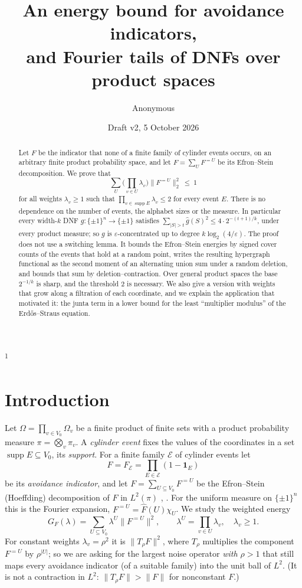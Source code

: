 \documentclass[11pt,reqno]{amsart}
\title[An energy bound for avoidance indicators]{An energy bound for avoidance indicators,\\
and Fourier tails of DNFs over product spaces}
\author{Anonymous}
\date{Draft v2, 5 October 2026}
\theoremstyle{definition}
\newcommand{\supp}{\operatorname{supp}}
\newcommand{\cE}{\mathcal E}
\begin{document}
\begin{abstract}
Let $F$ be the indicator that none of a finite family of cylinder events
occurs, on an arbitrary finite product probability space, and let
$F=\sum_UF^{=U}$ be its Efron--Stein decomposition.  We prove that
\[
 \sum_U\Big(\prod_{v\in U}\lambda_v\Big)\|F^{=U}\|_2^2\ \le\ 1
\]
for all weights $\lambda_v\ge1$ such that $\prod_{v\in\supp E}\lambda_v\le2$ for every
event $E$.  There is no dependence on the number of events, the alphabet
sizes or the measure.  In particular every width-$k$ DNF
$g:\{\pm1\}^n\to\{\pm1\}$ satisfies $\sum_{|S|>t}\hat g(S)^2\le4\cdot2^{-(t+1)/k}$, under
every product measure; so $g$ is $\varepsilon$-concentrated up to degree
$k\log_2(4/\varepsilon)$.  The proof does not use a switching lemma.  It bounds the
Efron--Stein energies by signed cover counts of the events that hold at a
random point, writes the resulting hypergraph functional as the second moment
of an alternating union sum under a random deletion, and bounds that sum by
deletion--contraction.  Over general product spaces the base $2^{-1/k}$ is
sharp, and the threshold $2$ is necessary.  We also give a version with
weights that grow along a filtration of each coordinate, and we explain the
application that motivated it: the junta term in a lower bound for the
least ``multiplier modulus'' of the Erd\H{o}s--Straus equation.
\end{abstract}

\maketitle
\hbox{\footnotesize\textsuperscript{1}}

\section{Introduction}\label{sec:intro}

Let $\Omega=\prod_{v\in V_0}\Omega_v$ be a finite product of finite sets with a
product probability measure $\pi=\bigotimes_v\pi_v$.  A \emph{cylinder event}
fixes the values of the coordinates in a set $\supp E\subseteq V_0$, its
\emph{support}.  For a finite family $\cE$ of cylinder events let
\[
 F=F_\cE=\prod_{E\in\cE}(1-\mathbf 1_E)
\]
be its \emph{avoidance indicator}, and let $F=\sum_{U\subseteq V_0}F^{=U}$ be the
Efron--Stein (Hoeffding) decomposition of $F$ in $L^2(\pi)$
\cite{ES,Hoeffding}, \cite[\S8.3]{OD}.  For the uniform measure on
$\{\pm1\}^n$ this is the Fourier expansion, $F^{=U}=\hat F(U)\chi_U$.  We
study the weighted energy
\[
 G_F(\lambda)=\sum_{U\subseteq V_0}\lambda^U\|F^{=U}\|^2,\qquad \lambda^U=\prod_{v\in U}\lambda_v,\quad\lambda_v\ge1 .
\]
For constant weights $\lambda_v=\rho^2$ it is $\|T_\rho F\|^2$, where $T_\rho$
multiplies the component $F^{=U}$ by $\rho^{|U|}$; so we are asking for the
largest noise operator \emph{with $\rho>1$} that still maps every avoidance indicator
(of a suitable family) into the unit ball of $L^2$.  (It is not a contraction
in $L^2$: $\|T_\rho F\|>\|F\|$ for nonconstant $F$.)
\end{document}
